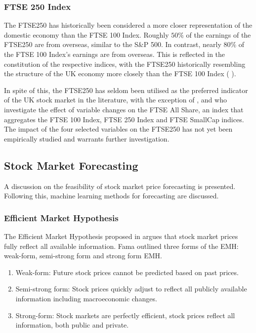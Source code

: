 \documentclass[11pt,a4paper]{article}
\newcommand{\citeboth}[1]{\citeauthor{#1} \citep{#1}}
\begin{document}
\subsubsection{FTSE 250 Index}

The FTSE250 has historically been considered a more closer representation of the domestic economy than the FTSE 100 Index. Roughly $50\%$ of the earnings of the FTSE250 are from overseas, similar to the S\&P 500. In contrast, nearly $80\%$ of the FTSE 100 Index's earnings are from overseas. 
This is reflected in the constitution of the respective indices, with the 
FTSE250 historically resembling the structure of the UK economy more closely than the FTSE 100 Index (\citeboth{ftse250history}).

In spite of this, the FTSE250 has seldom been utilised as the preferred indicator of the UK stock market in the literature,
with the exception of \citeboth{smit2023longrun}, \citeboth{khatri2024impact} and \citeboth{engstrom2006impact} who investigate the effect of variable changes on the FTSE All Share, an index that aggregates the 
FTSE 100 Index, FTSE 250 Index and FTSE SmallCap indices. The impact of the four selected variables on the FTSE250 has not yet been empirically studied and 
warrants further investigation.

\subsection{Stock Market Forecasting}

A discussion on the feasibility of stock market price forecasting is presented. Following this, machine learning methods for forecasting are 
discussed.


\subsubsection{Efficient Market Hypothesis}

The Efficient Market Hypothesis proposed in \citeboth{fama1970} argues that stock market prices fully 
reflect all available information. Fama outlined three forms of the EMH:
weak-form, semi-strong form and strong form EMH.
\begin{enumerate}
    \item Weak-form: Future stock prices cannot be predicted based on past prices.
    \item Semi-strong form: Stock prices quickly adjust to reflect all publicly available information including macroeconomic changes.  
    \item Strong-form: Stock markets are perfectly efficient, stock prices reflect all information, both public and private.
\end{enumerate}
\end{document}
